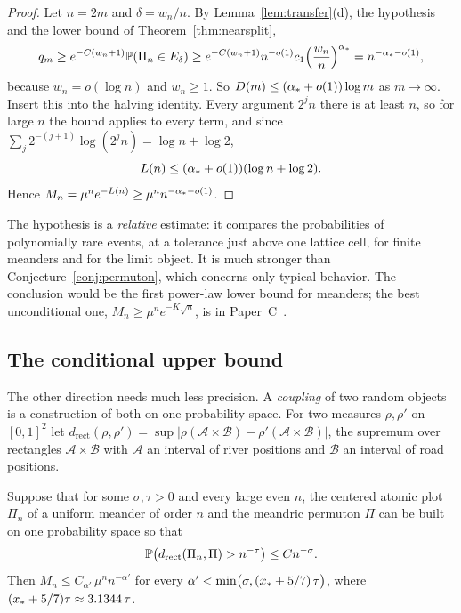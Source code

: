 \begin{proof}
Let $n=2m$ and $\delta=w_n/n$. By Lemma~\ref{lem:transfer}(d), the hypothesis and the lower bound of
Theorem~\ref{thm:nearsplit},
\[
q_m\ge e^{-C(w_n+1)}\mathbb{P}(\Pi_n\in E_\delta)\ge e^{-C(w_n+1)}n^{-o(1)}c_1\Bigl(\frac{w_n}n\Bigr)^{\alpha_*}
=n^{-\alpha_*-o(1)},
\]
because $w_n=o(\log n)$ and $w_n\ge1$. So $D(m)\le(\alpha_*+o(1))\log m$ as $m\to\infty$. Insert
this into the halving identity. Every argument $2^jn$ there is at least $n$, so for large $n$ the
bound applies to every term, and since $\sum_j2^{-(j+1)}\log(2^jn)=\log n+\log2$,
\[
L(n)\le(\alpha_*+o(1))(\log n+\log2).
\]
Hence $M_n=\mu^ne^{-L(n)}\ge\mu^nn^{-\alpha_*-o(1)}$.
\end{proof}

The hypothesis is a \emph{relative} estimate: it compares the probabilities of polynomially rare
events, at a tolerance just above one lattice cell, for finite meanders and for the limit object. It
is much stronger than Conjecture~\ref{conj:permuton}, which concerns only typical behavior. The conclusion would be the first power-law lower
bound for meanders; the best unconditional one, $M_n\ge\mu^ne^{-K\sqrt n}$, is in Paper~C~\cite{PaperC}.

\subsection{The conditional upper bound}

The other direction needs much less precision. A \emph{coupling} of two random objects is a
construction of both on one probability space. For two measures $\rho,\rho'$ on $[0,1]^2$ let
$d_{\mathrm{rect}}(\rho,\rho')=\sup|\rho(\mathcal A\times\mathcal B)-\rho'(\mathcal A\times\mathcal B)|$, the supremum over rectangles
$\mathcal A\times\mathcal B$ with $\mathcal A$ an interval of river positions and $\mathcal B$ an interval of
road positions.

\begin{proposition}\label{prop:condupper}
Suppose that for some $\sigma,\tau>0$ and every large even $n$, the centered atomic plot $\Pi_n$ of a
uniform meander of order $n$ and the meandric permuton $\Pi$ can be built on one probability space
so that
\[
\mathbb{P}\bigl(d_{\mathrm{rect}}(\Pi_n,\Pi)>n^{-\tau}\bigr)\le Cn^{-\sigma}.
\]
Then $M_n\le C_{\alpha'}\,\mu^nn^{-\alpha'}$ for every $\alpha'<\min\bigl(\sigma,(x_*+5/7)\,\tau\bigr)$, where
$(x_*+5/7)\tau\approx3.1344\,\tau$.
\end{proposition}

